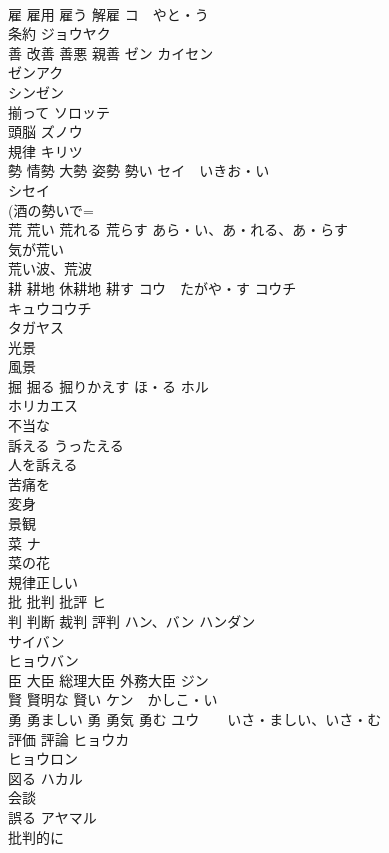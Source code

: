 \documentclass[8pt]{extreport}
\begin{document}
\begin{CJK}{UTF8}{min}
\\	雇 雇用 雇う 解雇	コ　やと・う 
\\	条約	ジョウヤク 
\\	善 改善 善悪 親善	ゼン カイセン 
\\	ゼンアク 
\\	シンゼン 
\\	揃って	ソロッテ 
\\	頭脳	ズノウ 
\\	規律	キリツ 
\\	勢 情勢 大勢 姿勢 勢い	セイ　いきお・い 
\\	シセイ 
\\	(酒の勢いで=
\\	荒 荒い 荒れる 荒らす	あら・い、あ・れる、あ・らす 
\\	気が荒い 
\\	荒い波、荒波 
\\	耕 耕地 休耕地 耕す	コウ　たがや・す コウチ 
\\	キュウコウチ 
\\	タガヤス 
\\	光景	
\\	風景	
\\	掘 掘る 掘りかえす	ほ・る ホル 
\\	ホリカエス 
\\	不当な	
\\	訴える	うったえる 
\\	人を訴える 
\\	苦痛を 
\\	変身	
\\	景観	
\\	菜	ナ 
\\	菜の花	
\\	規律正しい	
\\	批 批判 批評	ヒ 
\\	判 判断 裁判 評判	ハン、バン ハンダン 
\\	サイバン 
\\	ヒョウバン 
\\	臣 大臣 総理大臣 外務大臣	ジン 
\\	賢 賢明な 賢い	ケン　かしこ・い 
\\	勇 勇ましい 勇 勇気 勇む	ユウ　　いさ・ましい、いさ・む 
\\	評価 評論	ヒョウカ 
\\	ヒョウロン 
\\	図る	ハカル 
\\	会談	
\\	誤る	アヤマル 
\\	批判的に	

\end{CJK}
\end{document}
